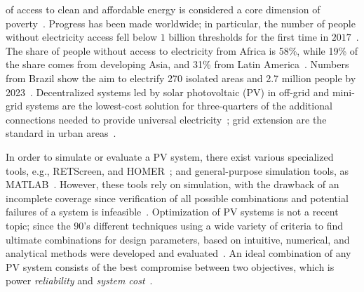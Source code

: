 \documentclass[journal]{IEEEtran}
\begin{document}

 of access to clean and affordable energy is considered a core dimension of poverty~\cite{Hussein2012}. Progress has been made worldwide; in particular, the number of people without electricity access fell below $1$ billion thresholds for the first time in $2017$~\cite{IEAweo2018}. The share of people without access to electricity from Africa is 58\%, while 19\% of the share comes from developing Asia, and 31\% from Latin America~\cite{IEAweo2018}. Numbers from Brazil show the aim to electrify 270 isolated areas and 2.7 million people by 2023~\cite{EPE2018}. 
Decentralized systems led by solar photovoltaic (PV) in off-grid and mini-grid systems are the lowest-cost solution for three-quarters of the additional connections needed to provide universal electricity~\cite{Hussein2012}; grid extension are the standard in urban areas~\cite{IEAweo2018}.

%
In order to simulate or evaluate a PV system, there exist various specialized tools, e.g., RETScreen, and HOMER~\cite{Pradhan,Swarnkar}; and general-purpose simulation tools, as MATLAB~\cite{Benatiallah2017}. However, these tools rely on simulation, with the drawback of an incomplete coverage since verification of all possible combinations and potential failures of a system is infeasible~\cite{ClarkeHV18}. 
%
Optimization of PV systems is not a recent topic; since the $90$'s different techniques using a wide variety of criteria to find ultimate combinations for design parameters, based on intuitive, numerical, and analytical methods were developed and evaluated~\cite{Applasamy2011}. An ideal combination of any PV system consists of the best compromise between two objectives, which is power \textit{reliability} and \textit{system cost}~\cite{Alsadi2018}.
\end{document}
